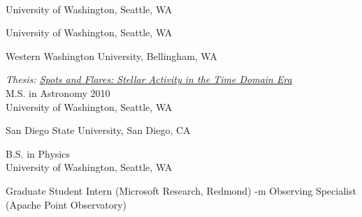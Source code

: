 \documentclass{article}
\begin{document}
\begin{llist}
\vspace{-0.1in}


\sectiontitle{}
  \href{https://dirac.astro.washington.edu}{\color{NavyBlue}{\sc Associate Director, DiRAC Institute}}\\
University of Washington, Seattle, WA





University of Washington, Seattle, WA


 Western Washington University, Bellingham, WA




{\it Thesis: \href{http://hdl.handle.net/1773/33558}{{\color{NavyBlue} Spots and Flares: Stellar Activity in the Time Domain Era}
}}\\
{\sc M.S. in Astronomy} \hfill 2010\\
University of Washington, Seattle, WA

San Diego State University, San Diego, CA

{\sc B.S. in Physics}\\
University of Washington, Seattle, WA


{\sc Graduate Student Intern} (Microsoft Research, Redmond) 
{-m Observing Specialist} (Apache Point Observatory) 





\end{llist}
\end{document}
